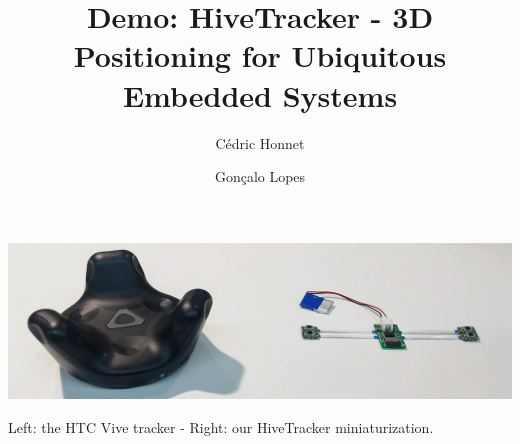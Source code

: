 \documentclass[sigchi]{acmart}
\begin{document}
\title{Demo: HiveTracker - 3D Positioning for Ubiquitous Embedded Systems}

\author{C\'edric Honnet}

\author{Gon\c{c}alo Lopes}

\begin{teaserfigure}
\centering
\includegraphics[width=1.0\columnwidth]{Figures/banner.jpg}
\caption{Left: the HTC Vive tracker - Right: our HiveTracker miniaturization.}
\label{Fig:Banner}
\end{teaserfigure}

\renewcommand{\shortauthors}{Honnet and Lopes}
\end{document}
